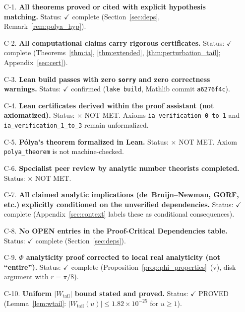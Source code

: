 \documentclass[11pt]{article}
\theoremstyle{definition}
\theoremstyle{remark}
\begin{document}
\begin{enumerate}
\item[C-1.] \textbf{All theorems proved or cited with explicit hypothesis matching.}
  Status: $\checkmark$ complete (Section~\ref{sec:deps}, Remark~\ref{rem:polya_hyp}).

\item[C-2.] \textbf{All computational claims carry rigorous certificates.}
  Status: $\checkmark$ complete (Theorems~\ref{thm:ia}, \ref{thm:extended}, \ref{thm:perturbation_tail}; Appendix~\ref{sec:cert}).

\item[C-3.] \textbf{Lean build passes with zero \texttt{sorry} and zero correctness warnings.}
  Status: $\checkmark$ confirmed (\texttt{lake build}, Mathlib commit \texttt{a6276f4c}).

\item[C-4.] \textbf{Lean certificates derived within the proof assistant (not axiomatized).}
  Status: $\times$ NOT MET. Axioms \texttt{ia\_verification\_0\_to\_1} and \texttt{ia\_verification\_1\_to\_3} remain unformalized.

\item[C-5.] \textbf{P\'olya's theorem formalized in Lean.}
  Status: $\times$ NOT MET. Axiom \texttt{polya\_theorem} is not machine-checked.

\item[C-6.] \textbf{Specialist peer review by analytic number theorists completed.}
  Status: $\times$ NOT MET.

\item[C-7.] \textbf{All claimed analytic implications (de~Bruijn--Newman, GORF, etc.)}
  \textbf{explicitly conditioned on the unverified dependencies.}
  Status: $\checkmark$ complete (Appendix~\ref{sec:context} labels these as conditional consequences).

\item[C-8.] \textbf{No OPEN entries in the Proof-Critical Dependencies table.}
  Status: $\checkmark$ complete (Section~\ref{sec:deps}).

\item[C-9.] \textbf{$\Phi$ analyticity proof corrected to local real analyticity (not ``entire'').}
  Status: $\checkmark$ complete (Proposition~\ref{prop:phi_properties}~(v), disk argument with $r=\pi/8$).

\item[C-10.] \textbf{Uniform $|W_{\mathrm{tail}}|$ bound stated and proved.}
  Status: $\checkmark$ PROVED (Lemma~\ref{lem:wtail}: $|W_{\mathrm{tail}}(u)|\leq 1.82\times 10^{-25}$ for $u\geq 1$).


\end{enumerate}
\end{document}
